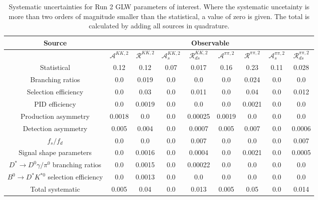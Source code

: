 \begin{sidewaystable}
  \centering
  \begin{tabular}{ccccccccc}
      \toprule
      Source & \multicolumn{8}{c}{Observable} \\
      \midrule
       & $\mathcal{A}^{KK,2}$ & $\mathcal{R}^{KK,2}$ & $\mathcal{A}_s^{KK,2}$ & $\mathcal{R}_{ds}^{KK,2}$ & $\mathcal{A}^{\pi\pi,2}$ & $\mathcal{R}^{\pi\pi,2}$ & $\mathcal{A}_s^{\pi\pi,2}$ & $\mathcal{R}_{ds}^{\pi\pi,2}$ \\
      \midrule
      Statistical & 0.12 & 0.12 & 0.07 & 0.017 & 0.16 & 0.23 & 0.11 & 0.028 \\
      \midrule
      Branching ratios & 0.0  & 0.019 & 0.0  & 0.0  & 0.0  & 0.024 & 0.0  & 0.0  \\
      Selection efficiency & 0.0  & 0.03 & 0.0  & 0.011 & 0.0  & 0.04 & 0.0  & 0.012 \\
      PID efficiency & 0.0  & 0.0019 & 0.0  & 0.0  & 0.0  & 0.0021 & 0.0  & 0.0  \\
      Production asymmetry & 0.0018 & 0.0  & 0.0  & 0.00025 & 0.0019 & 0.0  & 0.0  & 0.0  \\
      Detection asymmetry & 0.005 & 0.004 & 0.0  & 0.0007 & 0.005 & 0.007 & 0.0  & 0.0006 \\
      $f_s/f_d$ & 0.0  & 0.0  & 0.0  & 0.007 & 0.0  & 0.0  & 0.0  & 0.007 \\
      Signal shape parameters & 0.0  & 0.0016 & 0.0  & 0.0004 & 0.0  & 0.0021 & 0.0  & 0.0005 \\
      $D^* \to D^0 \gamma/\pi^0$ branching ratios & 0.0  & 0.0015 & 0.0  & 0.00022 & 0.0  & 0.0  & 0.0  & 0.0  \\
      $B^0 \to D^* K^{*0}$ selection efficiency & 0.0  & 0.0013 & 0.0  & 0.0  & 0.0  & 0.0  & 0.0  & 0.0  \\
      \midrule
      Total systematic & 0.005 & 0.04 & 0.0 & 0.013 & 0.005 & 0.05 & 0.0 & 0.014 \\
      \bottomrule
  \end{tabular}
  \caption{Systematic uncertainties for Run 2 GLW parameters of interest. Where the systematic uncetainty is more than two orders of magnitude smaller than the statistical, a value of zero is given. The total is calculated by adding all sources in quadrature.}
\label{tab:KK_run2_systematics}
\end{sidewaystable}
